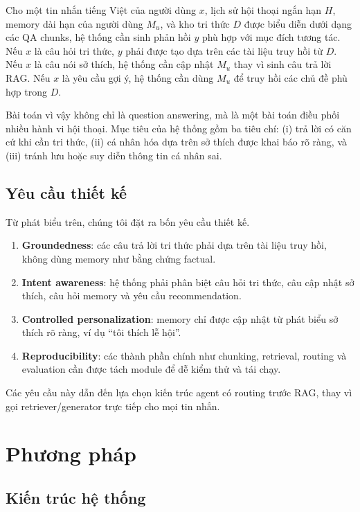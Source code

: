 \documentclass[11pt]{article}
\begin{document}
Cho một tin nhắn tiếng Việt của người dùng \(x\), lịch sử hội thoại ngắn hạn \(H\), memory dài hạn của người dùng \(M_u\), và kho tri thức \(D\) được biểu diễn dưới dạng các QA chunks, hệ thống cần sinh phản hồi \(y\) phù hợp với mục đích tương tác. Nếu \(x\) là câu hỏi tri thức, \(y\) phải được tạo dựa trên các tài liệu truy hồi từ \(D\). Nếu \(x\) là câu nói sở thích, hệ thống cần cập nhật \(M_u\) thay vì sinh câu trả lời RAG. Nếu \(x\) là yêu cầu gợi ý, hệ thống cần dùng \(M_u\) để truy hồi các chủ đề phù hợp trong \(D\).

Bài toán vì vậy không chỉ là question answering, mà là một bài toán điều phối nhiều hành vi hội thoại. Mục tiêu của hệ thống gồm ba tiêu chí: (i) trả lời có căn cứ khi cần tri thức, (ii) cá nhân hóa dựa trên sở thích được khai báo rõ ràng, và (iii) tránh lưu hoặc suy diễn thông tin cá nhân sai.

\subsection{Yêu cầu thiết kế}

Từ phát biểu trên, chúng tôi đặt ra bốn yêu cầu thiết kế.
\begin{enumerate}[leftmargin=*, itemsep=1pt]
    \item \textbf{Groundedness}: các câu trả lời tri thức phải dựa trên tài liệu truy hồi, không dùng memory như bằng chứng factual.
    \item \textbf{Intent awareness}: hệ thống phải phân biệt câu hỏi tri thức, câu cập nhật sở thích, câu hỏi memory và yêu cầu recommendation.
    \item \textbf{Controlled personalization}: memory chỉ được cập nhật từ phát biểu sở thích rõ ràng, ví dụ ``tôi thích lễ hội''.
    \item \textbf{Reproducibility}: các thành phần chính như chunking, retrieval, routing và evaluation cần được tách module để dễ kiểm thử và tái chạy.
\end{enumerate}

Các yêu cầu này dẫn đến lựa chọn kiến trúc agent có routing trước RAG, thay vì gọi retriever/generator trực tiếp cho mọi tin nhắn.

\section{Phương pháp}

\subsection{Kiến trúc hệ thống}
\end{document}
